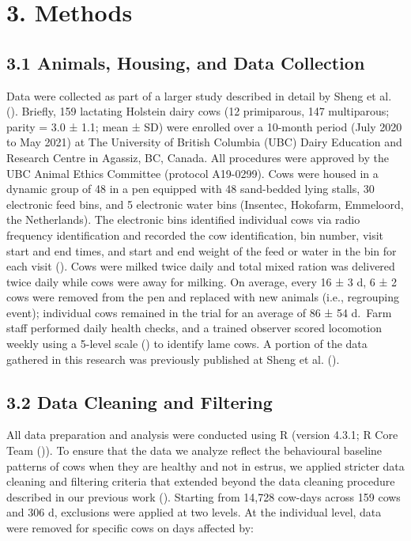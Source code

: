 \documentclass[
]{article}
\begin{document}
\section{3. Methods}\label{methods}

\subsection{3.1 Animals, Housing, and Data
Collection}\label{animals-housing-and-data-collection}

Data were collected as part of a larger study described in detail by
Sheng et al. (). Briefly, 159
lactating Holstein dairy cows (12 primiparous, 147 multiparous; parity =
3.0 ± 1.1; mean ± SD) were enrolled over a 10-month period (July 2020 to
May 2021) at The University of British Columbia (UBC) Dairy Education
and Research Centre in Agassiz, BC, Canada. All procedures were approved
by the UBC Animal Ethics Committee (protocol A19-0299). Cows were housed
in a dynamic group of 48 in a pen equipped with 48 sand-bedded lying
stalls, 30 electronic feed bins, and 5 electronic water bins (Insentec,
Hokofarm, Emmeloord, the Netherlands). The electronic bins identified
individual cows via radio frequency identification and recorded the cow
identification, bin number, visit start and end times, and start and end
weight of the feed or water in the bin for each visit
(). Cows
were milked twice daily and total mixed ration was delivered twice daily
while cows were away for milking. On average, every 16 ± 3 d, 6 ± 2 cows
were removed from the pen and replaced with new animals (i.e.,
regrouping event); individual cows remained in the trial for an average
of 86 ± 54 d.~Farm staff performed daily health checks, and a trained
observer scored locomotion weekly using a 5-level scale
() to identify
lame cows. A portion of the data gathered in this research was
previously published at Sheng et al.
().

\subsection{3.2 Data Cleaning and
Filtering}\label{data-cleaning-and-filtering}

All data preparation and analysis were conducted using R (version 4.3.1;
R Core Team ()). To ensure that the data we
analyze reflect the behavioural baseline patterns of cows when they are
healthy and not in estrus, we applied stricter data cleaning and
filtering criteria that extended beyond the data cleaning procedure
described in our previous work (). Starting from 14,728 cow-days across 159 cows and 306 d,
exclusions were applied at two levels. At the individual level, data
were removed for specific cows on days affected by:
\end{document}
